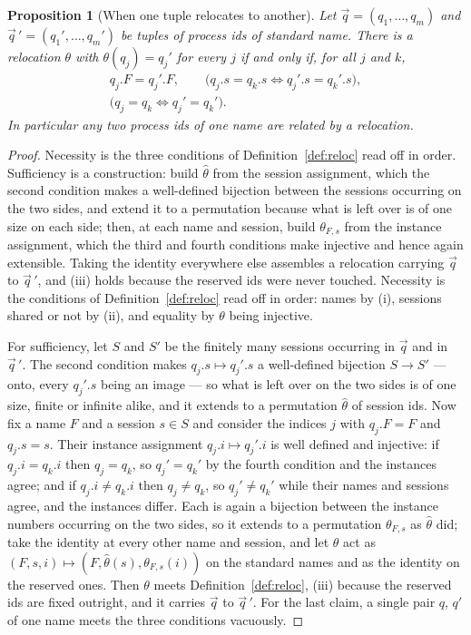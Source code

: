 \documentclass[10pt,oneside,openany]{book}
\theoremstyle{accentdef}
\theoremstyle{accentplain}
\newtheorem{proposition}[definition]{Proposition}
\begin{document}
\begin{proposition}[When one tuple relocates to another]\label{prop:orbit}
Let $\vec q = (q_1,\dots,q_m)$ and $\vec q\,' = (q_1',\dots,q_m')$ be tuples of process ids of
standard name. There is a relocation $\theta$ with $\theta(q_j) = q_j'$ for every $j$ if and only if,
for all $j$ and $k$,
\[
  \begin{gathered}
  q_j.F = q_j'.F, \qquad
  \bigl(q_j.s = q_k.s \iff q_j'.s = q_k'.s\bigr), \\[3pt]
  \bigl(q_j = q_k \iff q_j' = q_k'\bigr) .
  \end{gathered}
\]
In particular any two process ids of one name are related by a relocation.
\end{proposition}

\begin{proof}
Necessity is the three conditions of Definition~\ref{def:reloc} read off in order. Sufficiency is a
construction: build $\hat\theta$ from the session assignment, which the second condition makes a
well-defined bijection between the sessions occurring on the two sides, and extend it to a
permutation because what is left over is of one size on each side; then, at each name and session,
build $\theta_{F,s}$ from the instance assignment, which the third and fourth conditions make
injective and hence again extensible. Taking the identity everywhere else assembles a relocation
carrying $\vec q$ to $\vec q\,'$, and (iii) holds because the reserved ids were never touched.
Necessity is the conditions of Definition~\ref{def:reloc} read off in order: names by (i), sessions
shared or not by (ii), and equality by $\theta$ being injective.

For sufficiency, let $S$ and $S'$ be the finitely many sessions occurring in $\vec q$ and in
$\vec q\,'$. The second condition makes $q_j.s \mapsto q_j'.s$ a well-defined bijection $S \to S'$ ---
onto, every $q_j'.s$ being an image --- so what is left over on the two sides is of one size, finite or
infinite alike, and it extends to a permutation $\hat\theta$ of session ids. Now fix a name $F$
and a session $s \in S$ and consider the indices $j$ with $q_j.F = F$ and $q_j.s = s$. Their
instance assignment $q_j.i \mapsto q_j'.i$ is well defined and injective: if $q_j.i = q_k.i$ then
$q_j = q_k$, so $q_j' = q_k'$ by the fourth condition and the instances agree; and if
$q_j.i \neq q_k.i$ then $q_j \neq q_k$, so $q_j' \neq q_k'$ while their names and sessions agree, and
the instances differ. Each is again a bijection between the instance numbers occurring on the two
sides, so it extends to a permutation $\theta_{F,s}$ as $\hat\theta$ did; take the
identity at every other name and session, and let $\theta$ act as
$(F,s,i) \mapsto (F,\hat\theta(s),\theta_{F,s}(i))$ on the standard names and as the identity on the
reserved ones. Then $\theta$ meets Definition~\ref{def:reloc}, (iii) because the reserved ids are
fixed outright, and it carries $\vec q$ to $\vec q\,'$. For the last claim, a single pair $q$, $q'$ of
one name meets the three conditions vacuously.
\end{proof}
\end{document}
